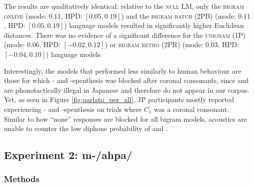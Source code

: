 The results are qualitatively identical: relative to the \textsc{null} LM, only the \textsc{bigram online} (mode: $0.11$, HPD: $[0.05, 0.19]$) and the \textsc{bigram batch (2PB)} (mode: $0.11$, HPD: $[0.05, 0.19]$) language models resulted in significantly higher Euclidean distances. There was no evidence of a significant difference for the \textsc{unigram (1P)} (mode: $0.06$, HPD: $[-0.02, 0.12]$) or \textsc{bigram retro (2PR)} (mode: $0.03$, HPD: $[-0.04, 0.10]$) language models 

Interestingly, the models that performed less similarly to human behaviour are those for which - and -epenthesis was blocked after coronal consonants, since  and  are phonotactically illegal in Japanese and therefore do not appear in our corpus. Yet, as seen in Figure \ref{fig:parlato_per_all}, JP participants mostly reported experiencing - and -epenthesis on trials where $C_{1}$ was a coronal consonant. Similar to how ``none'' responses are blocked for all bigram models, acoustics are unable to counter the low diphone probability of  and .

\subsection{Experiment 2: {\color{red}m-/ahpa/}}
\subsubsection{Methods}
